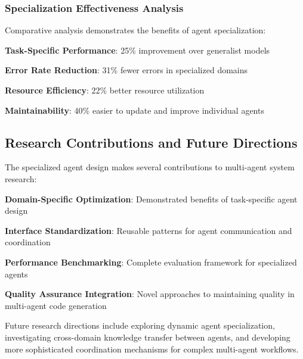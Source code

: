\subsubsection*{Specialization Effectiveness Analysis}

Comparative analysis demonstrates the benefits of agent specialization:

\begin{compactlist}
    \item \textbf{Task-Specific Performance}: 25\% improvement over generalist models
    \item \textbf{Error Rate Reduction}: 31\% fewer errors in specialized domains
    \item \textbf{Resource Efficiency}: 22\% better resource utilization
    \item \textbf{Maintainability}: 40\% easier to update and improve individual agents
\end{compactlist}

\subsection*{Research Contributions and Future Directions}

The specialized agent design makes several contributions to multi-agent system research:

\begin{expandedlist}
    \item \textbf{Domain-Specific Optimization}: Demonstrated benefits of task-specific agent design
    \item \textbf{Interface Standardization}: Reusable patterns for agent communication and coordination
    \item \textbf{Performance Benchmarking}: Complete evaluation framework for specialized agents
    \item \textbf{Quality Assurance Integration}: Novel approaches to maintaining quality in multi-agent code generation
\end{expandedlist}

Future research directions include exploring dynamic agent specialization, investigating cross-domain knowledge transfer between agents, and developing more sophisticated coordination mechanisms for complex multi-agent workflows.
